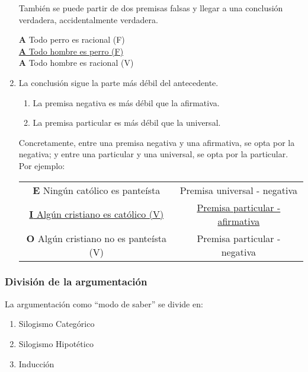 \documentclass{article}
\begin{document}
\begin{center}
\begin{enumerate}
      También se puede partir de dos premisas falsas y llegar a una conclusión verdadera,   accidentalmente verdadera.

     \begin{center}
             \textbf{A} Todo perro es racional (F) \\
             \underline{\textbf{A} Todo hombre es perro (F)} \\
             \textbf{A} Todo hombre es racional (V) \\
      \end{center}
      
    \item La conclusión sigue la parte más débil del antecedente.
    
    \begin{enumerate}
        \item La premisa negativa es más débil que la afirmativa.
        \item La premisa particular es más débil que la universal.
    \end{enumerate}
    Concretamente, entre una premisa negativa y una afirmativa, se opta por la negativa; y entre una particular y una universal, se opta por la particular. Por ejemplo:
    
    \begin{center}
    \begin{tabular}{c c}
         \textbf{E} Ningún católico es panteísta & Premisa universal - negativa \\
         \underline{\textbf{I} Algún cristiano es católico (V)} & \underline{Premisa particular - afirmativa} \\ 
         \textbf{O} Algún cristiano no es panteísta (V) & Premisa particular - negativa 
         \\
        \end{tabular}
    \end{center}
    
\end{enumerate}
 

\end{center}

\subsubsection{División de la argumentación}

 La argumentación como ``modo de saber'' se divide en:
 \begin{enumerate}
     \item Silogismo Categórico
     \item Silogismo Hipotético
     \item Inducción
 \end{enumerate}
 
\end{document}
